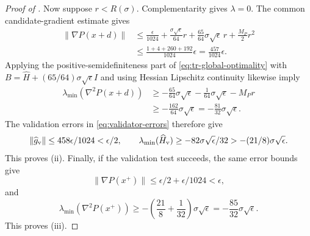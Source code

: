 \documentclass{article}
\begin{document}
\begin{proof}[Proof of ]
Now suppose $r<R(\sigma)$.  Complementarity gives $\lambda=0$.
The common candidate-gradient estimate gives
\begin{align*}
 \|\nabla P(x+d)\|
 &\le\frac{\epsilon}{1024}
 +\frac{\sigma\sqrt\epsilon}{64}r
 +\frac{65}{64}\sigma\sqrt\epsilon\,r
 +\frac{M_P}{2}r^2\\
 &\le\frac{1+4+260+192}{1024}\epsilon
 =\frac{457}{1024}\epsilon.
\end{align*}
Applying the positive-semidefiniteness part of
\eqref{eq:tr-global-optimality} with
$B=\widehat H+(65/64)\sigma\sqrt\epsilon I$ and using Hessian
Lipschitz continuity likewise imply
\begin{align*}
 \lambda_{\min}(\nabla^2P(x+d))
 &\ge-\frac{65}{64}\sigma\sqrt\epsilon
      -\frac{1}{64}\sigma\sqrt\epsilon-M_P r\\
 &\ge-\frac{162}{64}\sigma\sqrt\epsilon
 =-\frac{81}{32}\sigma\sqrt\epsilon.
\end{align*}
The validation errors in \eqref{eq:validator-errors} therefore give
\[
 \|\widehat g_{\rm v}\|
 \le458\epsilon/1024<\epsilon/2,
 \qquad
 \lambda_{\min}(\widehat H_{\rm v})
 \ge-82\sigma\sqrt\epsilon/32
 >-(21/8)\sigma\sqrt\epsilon.
\]
This proves (ii).  Finally, if the validation test succeeds, the same
error bounds give
\[
 \|\nabla P(x^+)\|
 \le\epsilon/2+\epsilon/1024<\epsilon,
\]
and
\[
 \lambda_{\min}(\nabla^2P(x^+))
 \ge-\left(\frac{21}{8}+\frac1{32}\right)
       \sigma\sqrt\epsilon
 =-\frac{85}{32}\sigma\sqrt\epsilon.
\]
This proves (iii).
\end{proof}
\end{document}

